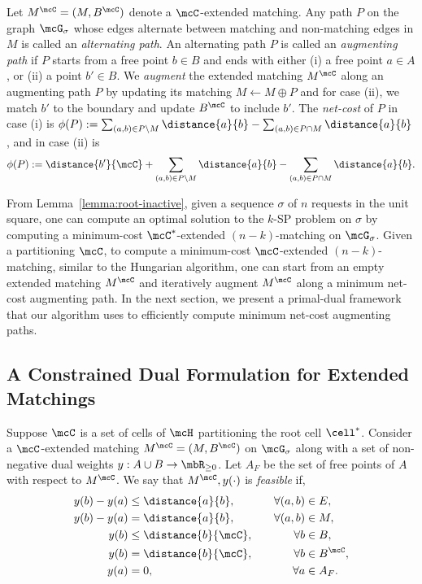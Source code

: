 Let $M^\mcC=(M, B^\mcC)$ denote a $\mcC$-extended matching.
Any path $P$ on the graph $\mcG_\sigma$ whose edges alternate between matching and non-matching edges in $M$ is called an \emph{alternating path}. 
An alternating path $P$ is called an \emph{augmenting path} if $P$ starts from a free point $b\in B$ and ends with either (i) a free point $a\in A$, or (ii) a point $b'\in B$.  We \emph{augment} the extended matching $M^{\mcC}$ along an augmenting path $P$ by updating its matching $M\leftarrow M\oplus P$ and for case (ii), we match $b'$ to the boundary and update $B^\mcC$ to include $b'$. The \emph{net-cost} of $P$ in case (i) is $\phi(P):=\sum_{(a,b)\in P\setminus M}\distance{a}{b} - \sum_{(a,b)\in P\cap M}\distance{a}{b}$, and 
in case (ii) is \[\phi(P):=\distance{b'}{\mcC} + \sum_{(a,b)\in P\setminus M}\distance{a}{b} - \sum_{(a,b)\in P\cap M}\distance{a}{b}.\] 


From Lemma~\ref{lemma:root-inactive}, given a sequence $\sigma$ of $n$ requests in the unit square, one can compute an optimal solution to the $k$-SP problem on $\sigma$ by computing a minimum-cost $\mcC^*$-extended $(n-k)$-matching on $\mcG_\sigma$. Given a partitioning $\mcC$, to compute a minimum-cost $\mcC$-extended $(n-k)$-matching, similar to the Hungarian algorithm, one can start from an empty extended matching $M^\mcC$ and iteratively augment $M^\mcC$ along a minimum net-cost augmenting path. In the next section, we present a primal-dual framework that our algorithm uses to efficiently compute minimum net-cost augmenting paths.




\subsection{A Constrained Dual Formulation for Extended Matchings}\label{sec:dual}
Suppose $\mcC$ is a set of cells of $\mcH$ partitioning the root cell $\cell^*$. Consider a $\mcC$-extended matching $M^\mcC=(M, B^\mcC)$ on $\mcG_\sigma$ along with a set of non-negative dual weights $y:A\cup B\rightarrow \mbR_{\ge0}$. Let $A_F$ be the set of free points of $A$ with respect to $M^\mcC$. We say that $M^{\mcC}, y(\cdot)$ is \emph{feasible} if,
\begin{align}
    y(b) - y(a) &\le \distance{a}{b},&  \quad \forall(a,b)&\in E,\label{eq:dualfeasibility-non-matching-time}\\
    y(b) - y(a) &= \distance{a}{b},& \quad \forall(a,b)&\in M,\label{eq:dualfeasibility-matching-time}\\
    y(b) &\le \distance{b}{\mcC},&  \quad \forall b&\in B,\label{eq:dualfeasibility-b}\\
    y(b) &= \distance{b}{\mcC},&  \quad \forall b&\in B^\mcC,\label{eq:dualfeasibility-b-admissible}\\
    y(a) &= 0,& \quad \forall a&\in A_F.\label{eq:dualfeasibility-a-free}
\end{align}

